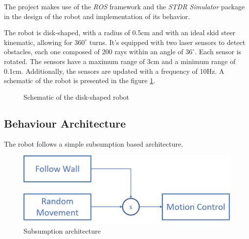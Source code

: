 \documentclass[10pt,journal,compsoc]{IEEEtran}
\begin{document}
The project makes use of the \textit{ROS} framework and the \textit{STDR Simulator} package in the design of the robot and implementation of its behavior.

The robot is disk-shaped, with a radius of 0.5cm and with an ideal skid steer kinematic, allowing for $360^{\circ}$ turns. It’s equipped with two laser sensors to detect obstacles, each one composed of 200 rays within an angle of $36^{\circ}$. Each sensor is rotated. The sensors have a maximum range of 3cm and a minimum range of 0.1cm. Additionally, the sensors are updated with a frequency of 10Hz. A schematic of the robot is presented in the figure \ref{fig:robot}.


   \begin{figure}[thpb]
      \centering
      \caption{Schematic of the disk-shaped robot}
      \label{fig:robot}
   \end{figure}
   
   
\subsection{Behaviour Architecture}

The robot follows a simple subsumption based architecture.

   \begin{figure}[thpb]
      \centering
      \includegraphics[scale=0.265]{img/architecture.jpg}
      \caption{Subsumption architecture}
      \label{fig:architecture}
   \end{figure}
\end{document}
